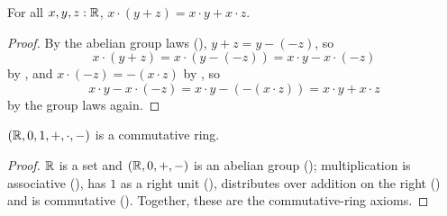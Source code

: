 \begin{corollary}
  \label{mulDistRPlusReal}
  For all $x, y, z : \mathbb{R}$, $x \cdot (y + z) = x \cdot y + x \cdot z$.
\end{corollary}
\begin{proof}
  By the abelian group laws (), $y + z = y - (-z)$, so
  \[
    x \cdot (y + z) = x \cdot (y - (-z)) = x \cdot y - x \cdot (-z)
  \]
  by , and $x \cdot (-z) = -(x \cdot z)$ by , so
  \[
    x \cdot y - x \cdot (-z) = x \cdot y - (-(x \cdot z)) = x \cdot y + x \cdot z
  \]
  by the group laws again.
\end{proof}

\begin{theorem}
  \label{RCommRing}
  $(\mathbb{R}, 0, 1, +, \cdot, -)$ is a commutative ring.
\end{theorem}
\begin{proof}
  $\mathbb{R}$ is a set and $(\mathbb{R}, 0, +, -)$ is an abelian group (); multiplication is associative (), has $1$ as a right unit (), distributes over addition on the right () and is commutative (). Together, these are the commutative-ring axioms.
\end{proof}
